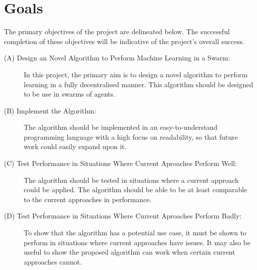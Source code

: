 \section{Goals} \label{goals}
The primary objectives of the project are delineated below. The successful completion of these objectives will be indicative of the project's overall success.
\begin{description}
	\item[(A) Design an Novel Algorithm to Perform Machine Learning in a Swarm:] In this project, the primary aim is to design a novel algorithm to perform learning in a fully decentralised manner. This algorithm should be designed to be use in swarms of agents.
	\item[(B) Implement the Algorithm:] The algorithm should be implemented in an easy-to-understand programming language with a high focus on readability, so that future work could easily expand upon it.
	\item[(C) Test Performance in Situations Where Current Aproaches Perform Well:] The algorithm should be tested in situations where a current approach could be applied. The algorithm should be able to be at least comparable to the current approaches in performance.
	\item[(D) Test Performance in Situations Where Current Aproaches Perform Badly:] To show that the algorithm has a potential use case, it must be shown to perform in situations where current approaches have issues. It may also be useful to show the proposed algorithm can work when certain current approaches cannot.
\end{description}